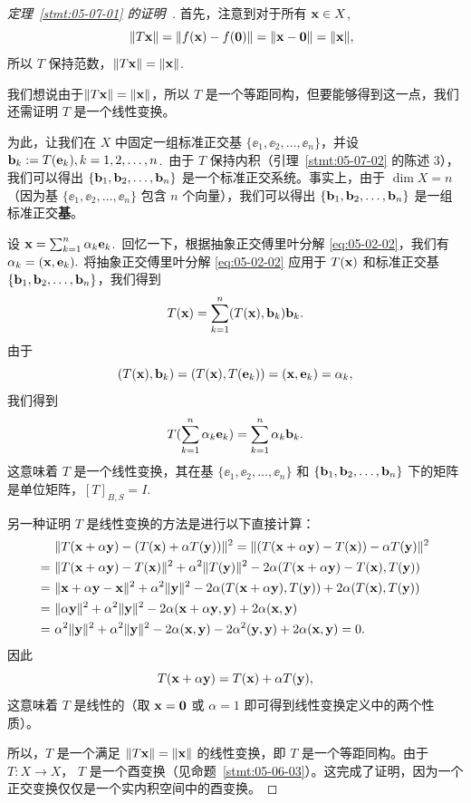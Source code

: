 \begin{proof}[\normalfont\heiti 定理~\ref{stmt:05-07-01} 的证明~\nopunct]首先，注意到对于所有 $\mathbf{x} \in X$,
$$\quad \|T\mathbf{x}\| = \|f(\mathbf{x}) - f(\mathbf{0})\| = \|\mathbf{x} - \mathbf{0}\| = \|\mathbf{x}\|,$$
所以 $T$ 保持范数，$\|T\mathbf{x}\| = \|\mathbf{x}\|$.~

我们想说由于$\|T\mathbf{x}\| = \|\mathbf{x}\|$，所以 $T$ 是一个等距同构，但要能够得到这一点，我们还需证明 $T$ 是一个线性变换。

为此，让我们在 $X$ 中固定一组标准正交基 $\{\ee_1, \ee_2, \dots, \ee_n\}$，并设 $\mathbf{b}_k := T(\mathbf{e}_k),  k=1, 2, \dots, n$.~由于 $T$ 保持内积（引理~\ref{stmt:05-07-02} 的陈述 3），我们可以得出 $\{\mathbf{b}_1, \mathbf{b}_2, \dots, \mathbf{b}_n\}$ 是一个标准正交系统。事实上，由于 $\dim X = n$（因为基 $\{\ee_1, \ee_2, \dots, \ee_n\}$ 包含 $n$ 个向量），我们可以得出 $\{\mathbf{b}_1, \mathbf{b}_2, \dots, \mathbf{b}_n\}$ 是一组标准正交\textbf{基}。

设 $\mathbf{x} = \sum_{k=1}^n \alpha_k \mathbf{e}_k$.~回忆一下，根据抽象正交傅里叶分解 \eqref{eq:05-02-02}，我们有
$\alpha_k = (\mathbf{x}, \mathbf{e}_k).$
将抽象正交傅里叶分解 \eqref{eq:05-02-02} 应用于 $T(\mathbf{x})$ 和标准正交基 $\{\mathbf{b}_1, \mathbf{b}_2, \dots, \mathbf{b}_n\}$，我们得到
$$T(\mathbf{x}) = \sum_{k=1}^n (T(\mathbf{x}), \mathbf{b}_k) \mathbf{b}_k.$$
由于
$$(T(\mathbf{x}), \mathbf{b}_k) = (T(\mathbf{x}), T(\mathbf{e}_k)) = (\mathbf{x}, \mathbf{e}_k) = \alpha_k,$$
我们得到
$$T(\sum_{k=1}^n \alpha_k \mathbf{e}_k) = \sum_{k=1}^n \alpha_k \mathbf{b}_k.$$
这意味着 $T$ 是一个线性变换，其在基 $\{\ee_1, \ee_2, \dots, \ee_n\}$ 和 $\{\mathbf{b}_1, \mathbf{b}_2, \dots, \mathbf{b}_n\}$ 下的矩阵是单位矩阵，$[T]_{B,S} = I$.~

另一种证明 $T$ 是线性变换的方法是进行以下直接计算：
\begin{equation} \notag
\begin{split}
&\ \|T(\mathbf{x} + \alpha \mathbf{y}) - (T(\mathbf{x}) + \alpha T(\mathbf{y}))\|^2  = \|(T(\mathbf{x} + \alpha \mathbf{y}) - T(\mathbf{x})) - \alpha T(\mathbf{y})\|^2    \\
=&\ \|T(\mathbf{x} + \alpha \mathbf{y}) - T(\mathbf{x})\|^2 + \alpha^2 \|T(\mathbf{y})\|^2 - 2\alpha (T(\mathbf{x} + \alpha \mathbf{y}) - T(\mathbf{x}), T(\mathbf{y}))  \\
=&\  \|\mathbf{x} + \alpha \mathbf{y} - \mathbf{x}\|^2 + \alpha^2\|\mathbf{y}\|^2 - 2\alpha(T(\mathbf{x}+\alpha \mathbf{y}), T(\mathbf{y})) + 2\alpha(T(\mathbf{x}), T(\mathbf{y})) \\
=&\  \|\alpha \mathbf{y}\|^2 + \alpha^2\|\mathbf{y}\|^2 - 2\alpha(\mathbf{x}+\alpha \mathbf{y}, \mathbf{y}) + 2\alpha(\mathbf{x}, \mathbf{y})  \\
=&\  \alpha^2\|\mathbf{y}\|^2 + \alpha^2\|\mathbf{y}\|^2 - 2\alpha(\mathbf{x}, \mathbf{y}) - 2\alpha^2(\mathbf{y}, \mathbf{y}) + 2\alpha(\mathbf{x}, \mathbf{y})= 0.
\end{split}
\end{equation}
 因此
$$T(\mathbf{x}+\alpha \mathbf{y}) = T(\mathbf{x}) + \alpha T(\mathbf{y}),$$
这意味着 $T$ 是线性的（取 $\mathbf{x}=\mathbf{0}$ 或 $\alpha=1$ 即可得到线性变换定义中的两个性质）。

所以，$T$ 是一个满足 $\|T\mathbf{x}\| = \|\mathbf{x}\|$ 的线性变换，即 $T$ 是一个等距同构。由于 $T: X \to X$， $T$ 是一个酉变换（见命题~\ref{stmt:05-06-03}）。这完成了证明，因为一个正交变换仅仅是一个实内积空间中的酉变换。\end{proof}

